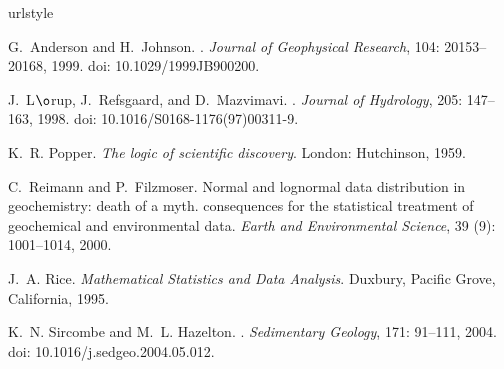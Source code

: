 \documentclass{article}
\begin{document}
\begin{thebibliography}{6}
\providecommand{\natexlab}[1]{#1}
\providecommand{\url}[1]{\texttt{#1}}
\expandafter\ifx\csname urlstyle\endcsname\relax
  \providecommand{\doi}[1]{doi: #1}\else
  \providecommand{\doi}{doi: \begingroup \urlstyle{rm}\Url}\fi

G.~{Anderson} and H.~{Johnson}.
.
\newblock \emph{Journal of Geophysical Research}, 104: 20153--20168,
  1999.
\newblock \doi{10.1029/1999JB900200}.

J.~{L$\o$rup}, J.~{Refsgaard}, and D.~{Mazvimavi}.
.
\newblock \emph{Journal of Hydrology}, 205: 147--163, 1998.
\newblock \doi{10.1016/S0168-1176(97)00311-9}.

K.~R. Popper.
\newblock \emph{The logic of scientific discovery}.
\newblock London: Hutchinson, 1959.

C.~Reimann and P.~Filzmoser.
\newblock Normal and lognormal data distribution in geochemistry: death of a
  myth. consequences for the statistical treatment of geochemical and
  environmental data.
\newblock \emph{Earth and Environmental Science}, 39 (9):
  1001--1014, 2000.

J.~A. Rice.
\newblock \emph{Mathematical Statistics and Data Analysis}.
\newblock Duxbury, Pacific Grove, California, 1995.

K.~N. {Sircombe} and M.~L. {Hazelton}.
.
\newblock \emph{Sedimentary Geology}, 171: 91--111, 2004.
\newblock \doi{10.1016/j.sedgeo.2004.05.012}.

\end{thebibliography}

% 

\clearpage
\end{document}
